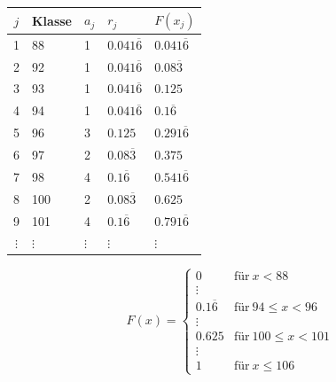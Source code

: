 \begin{table}[H]
\centering
\begin{tabular}{c|llll}
     $j$      & Klasse   & $a_j$     & $r_j$               & $F(x_j)$ \\ \hline
     1        & 88       & 1         & $0.041\overline{6}$ & $0.041\overline{6}$ \\
     2        & 92       & 1         & $0.041\overline{6}$ & $0.08\overline{3}$  \\
     3        & 93       & 1         & $0.041\overline{6}$ & $0.125$             \\
     4        & 94       & 1         & $0.041\overline{6}$ & $0.1\overline{6}$   \\
     5        & 96       & 3         & $0.125$             & $0.291\overline{6}$ \\
     6        & 97       & 2         & $0.08\overline{3}$  & $0.375$             \\
     7        & 98       & 4         & $0.1\overline{6}$   & $0.541\overline{6}$ \\
     8        & 100      & 2         & $0.08\overline{3}$  & $0.625$             \\
     9        & 101      & 4         & $0.1\overline{6}$   & $0.791\overline{6}$ \\
     $\vdots$ & $\vdots$ & $\vdots$  & $\vdots$            & $\vdots$
\end{tabular}
\end{table}

$$
F(x) = \begin{cases}
    0      & \text{für}~x<88 \\
    \vdots & \\
    0.1\overline{6} & \text{für}~94\le x<96 \\
    \vdots & \\
    0.625  & \text{für}~100\le x<101 \\
    \vdots & \\
    1      & \text{für}~x\le 106
\end{cases}
$$

